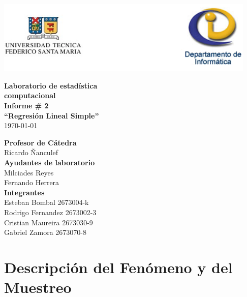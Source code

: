 \documentclass[letterpaper,spanish,11pt]{article}
\begin{document}
\begin{titlepage}
\begin{center}
\includegraphics[height=3.5cm]{images/logo_latex}  %
\end{center}
\vspace{1.5cm}
\begin{center}
\textbf{\Huge{Laboratorio de estad\'istica}}\\[0.2cm]
\textbf{\Huge{computacional}}\\[0.7cm]
\textbf{\huge{Informe \# 2}}\\[0.7cm]
\textbf{\huge{``Regresi\'on Lineal Simple''}}\\[0.3cm] %
\today\\[1.5cm]
\end{center}
\vspace{3cm}
\begin{flushright}
\large{\textbf{Profesor de C\'atedra}} \\
\large{Ricardo \~{N}anculef} \\[0.5cm]
\large{\textbf{Ayudantes de laboratorio}}\\
\large{Milciades Reyes}\\
\large{Fernando Herrera}\\[0.5cm]
\large{\textbf{Integrantes}} \\
\large{Esteban Bombal 2673004-k} \\
\large{Rodrigo Fernandez 2673002-3} \\
\large{Cristian Maureira 2673030-9} \\
\large{Gabriel Zamora 2673070-8} \\
\end{flushright}
\end{titlepage}

\section*{Descripci\'on del Fen\'omeno y del Muestreo}
\end{document}
